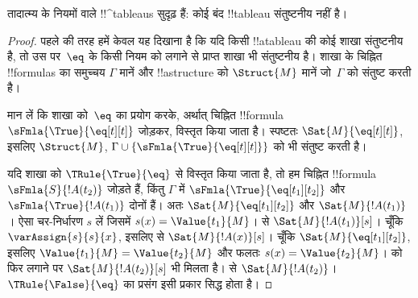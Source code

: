 \documentclass[../../../include/open-logic-section]{subfiles}
\begin{document}


\begin{prop}
तादात्म्य के नियमों वाले !!^{tableau}s सुदृढ़ हैं: कोई बंद !!{tableau}
संतुष्टनीय नहीं है।
\end{prop}

\begin{proof}
पहले की तरह हमें केवल यह दिखाना है कि यदि किसी !!a{tableau} की कोई शाखा
संतुष्टनीय है, तो उस पर~$\eq$ के किसी नियम को लगाने से प्राप्त शाखा भी
संतुष्टनीय है। शाखा के चिह्नित !!{formula}s का समुच्चय $\Gamma$ मानें और
!!a{structure} को $\Struct{M}$ मानें जो~$\Gamma$ को संतुष्ट करती है।

मान लें कि शाखा को~$\eq$ का प्रयोग करके, अर्थात् चिह्नित
!!{formula}~$\sFmla{\True}{\eq[t][t]}$ जोड़कर, विस्तृत किया जाता है। स्पष्टतः
$\Sat{M}{\eq[t][t]}$, इसलिए $\Struct{M}$, $\Gamma \cup
\{\sFmla{\True}{\eq[t][t]}\}$ को भी संतुष्ट करती है।

यदि शाखा को $\TRule{\True}{\eq}$ से विस्तृत किया जाता है, तो हम चिह्नित
!!{formula}~$\sFmla{S}{!A(t_2)}$ जोड़ते हैं, किंतु $\Gamma$ में
$\sFmla{\True}{\eq[t_1][t_2]}$ और $\sFmla{\True}{!A(t_1)}$ दोनों हैं। अतः
$\Sat{M}{\eq[t_1][t_2]}$ और $\Sat{M}{!A(t_1)}$। ऐसा चर-निर्धारण $s$ लें
जिसमें $s(x) = \Value{t_1}{M}$।
 से $\Sat{M}{!A(t_1)}[s]$। चूँकि
$\varAssign{s}{s}{x}$, इसलिए  से
$\Sat{M}{!A(x)}[s]$। चूँकि $\Sat{M}{\eq[t_1][t_2]}$, इसलिए
$\Value{t_1}{M} = \Value{t_2}{M}$ और फलतः $s(x) = \Value{t_2}{M}$।
 को फिर लगाने पर
$\Sat{M}{!A(t_2)}[s]$ भी मिलता है।
 से $\Sat{M}{!A(t_2)}$।
$\TRule{\False}{\eq}$ का प्रसंग इसी प्रकार सिद्ध होता है।
\end{proof}
\end{document}
